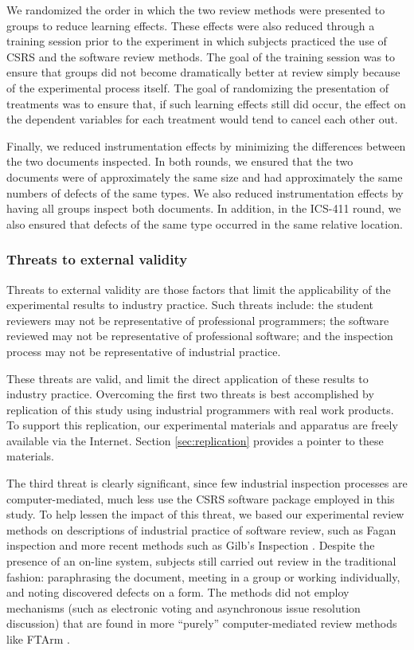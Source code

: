 We randomized the order in which the two review methods were presented to
groups to reduce learning effects. These effects were also reduced through
a training session prior to the experiment in which subjects practiced the
use of CSRS and the software review methods. The goal of the training
session was to ensure that groups did not become dramatically better at
review simply because of the experimental process itself. The goal of
randomizing the presentation of treatments was to ensure that, if such
learning effects still did occur, the effect on the dependent variables for
each treatment would tend to cancel each other out.

Finally, we reduced instrumentation effects by minimizing the differences
between the two documents inspected. In both rounds, we ensured that the
two documents were of approximately the same size and had approximately the
same numbers of defects of the same types. We also reduced instrumentation
effects by having all groups inspect both documents.  In addition, in the
ICS-411 round, we also ensured that defects of the same type occurred in
the same relative location.

\subsubsection{Threats to external validity}

Threats to external validity are those factors that limit the applicability
of the experimental results to industry practice. Such threats include: the
student reviewers may not be representative of professional programmers;
the software reviewed may not be representative of professional software;
and the inspection process may not be representative of industrial
practice. 

These threats are valid, and limit the direct application of these results
to industry practice.  Overcoming the first two threats is best
accomplished by replication of this study using industrial programmers with
real work products. To support this replication, our experimental materials
and apparatus are freely available via the Internet. Section
\ref{sec:replication} provides a pointer to these materials.  

The third threat is clearly significant, since few industrial inspection
processes are computer-mediated, much less use the CSRS software package
employed in this study.  To help lessen the impact of this threat, we based
our experimental review methods on descriptions of industrial practice of
software review, such as Fagan inspection \cite {Fagan76} and more recent
methods such as Gilb's Inspection \cite{Gilb93}. Despite the presence of
an on-line system, subjects still carried out review in the traditional
fashion: paraphrasing the document, meeting in a group or working
individually, and noting discovered defects on a form.  The methods did not
employ mechanisms (such as electronic voting and asynchronous issue
resolution discussion) that are found in more ``purely'' computer-mediated
review methods like FTArm \cite{Johnson94}.


